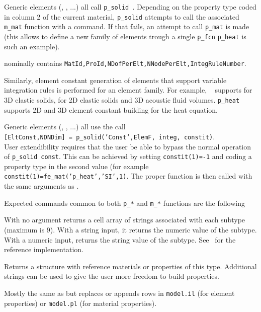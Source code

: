 Generic elements (\hexah, \qfourp, ...) all call {\tt p\_solid }. Depending on the property type coded in column 2 of the current material, {\tt p\_solid} attempts to call the associated {\tt m\_{\ti mat}} function with a  command. If that fails, an attempt to call {\tt p\_{\ti mat}} is made (this allows to define a new family of elements trough a single {\tt p\_fcn} {\tt p\_heat} is such an example). 

 nominally contains {\tt MatId,ProId,NDofPerElt,NNodePerElt,IntegRuleNumber}.


Similarly, element constant generation of elements that support variable integration rules is performed for an element family. For example, \psolid\  supports for 3D elastic solids, for 2D elastic solids and 3D acoustic fluid volumes. {\tt p\_heat} supports 2D and 3D element constant building for the heat equation.

Generic elements (\hexah, \qfourp, ...) all use the call \\
{\tt [EltConst,NDNDim] = p\_solid('Const',ElemF, integ, constit)}.\\
User extendibility requires that the user be able to bypass the normal operation of {\tt p\_solid const}. This can be achieved by setting {\tt constit(1)=-1} and coding a property type in the second value (for example {\tt constit(1)=fe\_mat('p\_heat','SI',1)}. The proper function is then called with the same arguments as \psolid.


Expected commands common to both {\tt p\_*} and {\tt m\_*} functions are the following


With no argument returns a cell array of strings associated with each subtype (maximum is 9). With a string input, it returns the numeric value of the subtype. With a numeric input, returns the string value of the subtype. See \melastic\ for the reference implementation.


Returns a structure with reference materials or properties of this type. Additional strings can be used to give the user more freedom to build properties.


Mostly the same as  but replaces or appends rows in {\tt model.il} (for element properties) or {\tt model.pl} (for material properties).

